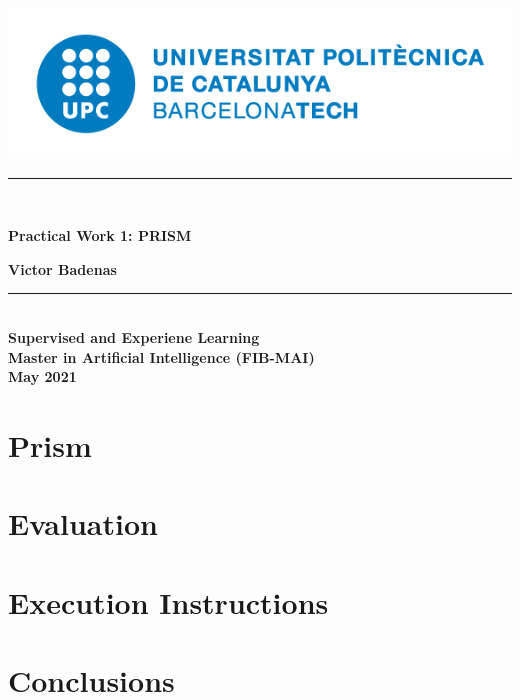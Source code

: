 \documentclass[oneside,11pt]{book}
\begin{document}
\titleformat{\chapter}[display]
{\normalfont\huge\bfseries}{\chaptertitlename\ \thechapter}{20pt}{\Huge}
\includegraphics[scale=.3]{upc-logo.png}
\begin{center}
\vspace*{2in}
\noindent\hfil\rule{17cm}{0.2mm}\hfil\\
\begin{Huge}
    \textbf{Practical Work 1: PRISM\\}
\end{Huge}
\vspace*{0.3in}
\begin{large}
    \textbf{Victor Badenas}
\end{large}
\noindent\hfil\rule{17cm}{0.2mm}\hfil\\
\vspace*{3in}
\textbf{Supervised and Experiene Learning\\}
\textbf{Master in Artificial Intelligence (FIB-MAI)\\}
\vspace*{0.2in}
\textbf{May 2021}

\end{center}
\thispagestyle{empty}
\clearpage

\tableofcontents
{}
\clearpage
{}

\chapter{Prism}


\chapter{Evaluation}


\chapter{Execution Instructions}


\chapter{Conclusions}


\printbibliography
\end{document}

